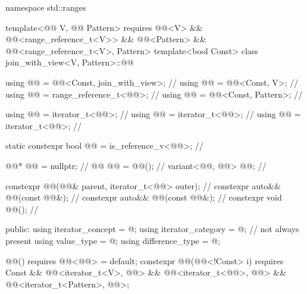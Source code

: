 \begin{codeblock}
namespace std::ranges {
  template<@@ V, @@ Pattern>
    requires @@<V> && @@<range_reference_t<V>>
          && @@<Pattern> && @@<range_reference_t<V>, Pattern>
  template<bool Const>
  class join_with_view<V, Pattern>::@@ {
    using @@ = @@<Const, join_with_view>;                  // \expos
    using @@ = @@<Const, V>;                                 // \expos
    using @@ = range_reference_t<@@>;                          // \expos
    using @@ = @@<Const, Pattern>;                    // \expos

    using @@ = iterator_t<@@>;                                 // \expos
    using @@ = iterator_t<@@>;                            // \expos
    using @@ = iterator_t<@@>;                        // \expos

    static constexpr bool @@ = is_reference_v<@@>;   // \expos

    @@* @@ = nullptr;                                          // \expos
    @@ @@ = @@();                                  // \expos
    variant<@@, @@> @@;                          // \expos

    constexpr @@(@@& parent, iterator_t<@@> outer);         // \expos
    constexpr auto&& @@(const @@&);                    // \expos
    constexpr auto&& @@(const @@&);                       // \expos
    constexpr void @@();                                           // \expos

  public:
    using iterator_concept = @\seebelow@;
    using iterator_category = @\seebelow@;                                // not always present
    using value_type = @\seebelow@;
    using difference_type = @\seebelow@;

    @@() requires @@<@@> = default;
    constexpr @@(@@<!Const> i)
        requires Const && @@<iterator_t<V>, @@> &&
                 @@<iterator_t<@@>, @@> &&
                 @@<iterator_t<Pattern>, @@>;

}}
\end{codeblock}
